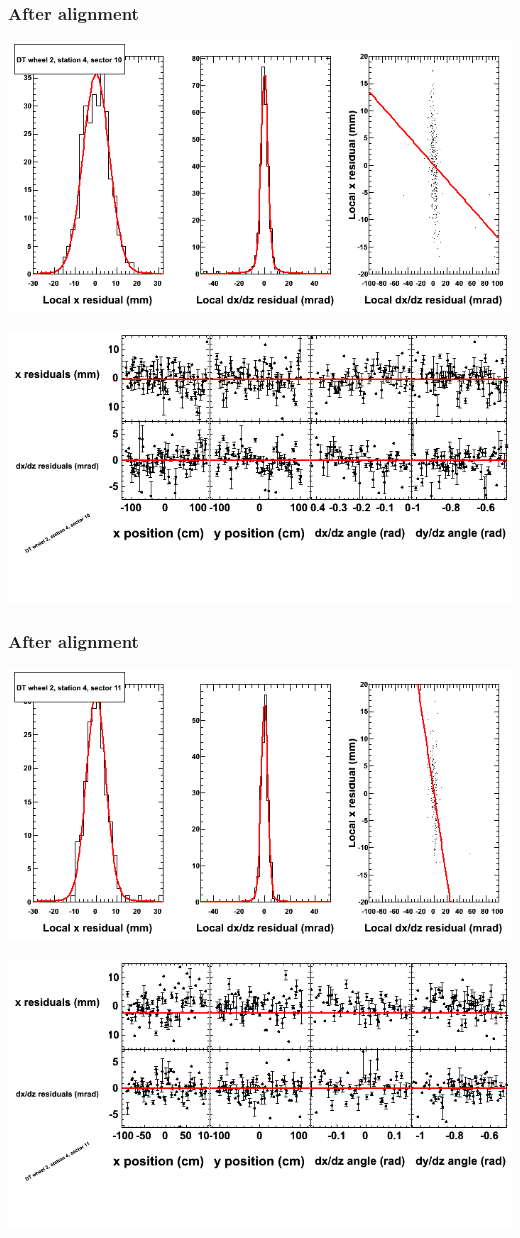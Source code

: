 \documentclass[compress]{beamer}
\begin{document}
\begin{frame}
\frametitle{After alignment}
\includegraphics[width=0.7\linewidth]{NOV4_fitfunctions/MBwhEst4sec10_bellcurves.png}

\includegraphics[width=0.7\linewidth]{NOV4_fitfunctions/MBwhEst4sec10_polynomials.png}
\end{frame}

\begin{frame}
\frametitle{After alignment}
\includegraphics[width=0.7\linewidth]{NOV4_fitfunctions/MBwhEst4sec11_bellcurves.png}

\includegraphics[width=0.7\linewidth]{NOV4_fitfunctions/MBwhEst4sec11_polynomials.png}
\end{frame}
\end{document}

